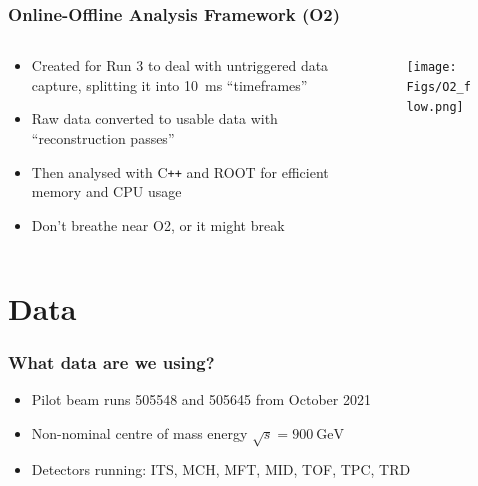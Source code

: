 \documentclass[11pt]{beamer}
\begin{document}
\begin{frame}
    \frametitle{Online-Offline Analysis Framework (O2)}

    \begin{columns}[c]
        \begin{column}{0.5\textwidth}
            \begin{itemize}
                \item Created for Run 3 to deal with untriggered data capture, splitting it into \SI{10}{\milli\second} ``timeframes''
                \item Raw data converted to usable data with ``reconstruction passes''
                \item Then analysed with C\texttt{++} and ROOT for efficient memory and CPU usage
                \item Don't breathe near O2, or it might break
            \end{itemize}
        \end{column}

        \begin{column}{0.5\textwidth}
            \begin{figure}
                \begin{center}
                    \texttt{[image: Figs/O2\_flow.png]}
                \end{center}
            \end{figure}
        \end{column}
    \end{columns}

\end{frame}

\section{Data}

\begin{frame}
    \frametitle{What data are we using?}

    \begin{itemize}
        \item Pilot beam runs 505548 and 505645 from October 2021
        \item Non-nominal centre of mass energy $\sqrt{s}=\SI{900}{\giga\electronvolt}$
        \item Detectors running: ITS, MCH, MFT, MID, TOF, TPC, TRD
    \end{itemize}

\end{frame}
\end{document}

